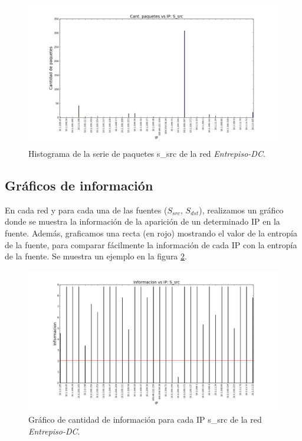   \begin{figure}[H]
  \begin{center}
    \includegraphics[width=0.8\linewidth]{../imgs/red-entrepiso-dc_S_src_hist.png}
    \caption{Histograma de la serie de paquetes s\_src de la red \emph{Entrepiso-DC}.}
    \label{fig:histograma-entrepiso-dc-s-src-ejemplo}
  \end{center}
  \end{figure}
  
\subsection{Gráficos de información}

  En cada red y para cada una de las fuentes ($S_{src}$, $S_{dst}$), realizamos un gráfico donde se muestra la información de la aparición de un determinado IP en la fuente. Además, graficamos una recta (en rojo) mostrando el valor de la entropía de la fuente, para comparar fácilmente la información de cada IP con la entropía de la fuente. Se muestra un ejemplo en la figura \ref{fig:informacion-entrepiso-dc-s-src-ejemplo}.
  
  \begin{figure}  
  \begin{center}
    \includegraphics[width=0.8\linewidth]{../imgs/red-entrepiso-dc_S_src_info.png}
    \caption{Gráfico de cantidad de información para cada IP s\_src de la red \emph{Entrepiso-DC}.}
    \label{fig:informacion-entrepiso-dc-s-src-ejemplo}
  \end{center}
\end{figure}